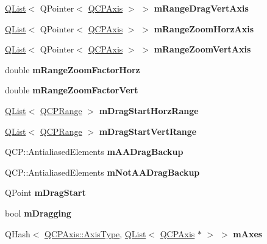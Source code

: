 \begin{DoxyCompactItemize}
\hyperlink{class_q_list}{Q\+List}$<$ Q\+Pointer$<$ \hyperlink{class_q_c_p_axis}{Q\+C\+P\+Axis} $>$ $>$ {\bfseries m\+Range\+Drag\+Vert\+Axis}
\item 
\mbox{\label{class_q_c_p_axis_rect_a3700988ec7ee02412de1fae4a75f7bf0}} 
\hyperlink{class_q_list}{Q\+List}$<$ Q\+Pointer$<$ \hyperlink{class_q_c_p_axis}{Q\+C\+P\+Axis} $>$ $>$ {\bfseries m\+Range\+Zoom\+Horz\+Axis}
\item 
\mbox{\label{class_q_c_p_axis_rect_ab6b597596c4cbfdf9b90aefd59863fdf}} 
\hyperlink{class_q_list}{Q\+List}$<$ Q\+Pointer$<$ \hyperlink{class_q_c_p_axis}{Q\+C\+P\+Axis} $>$ $>$ {\bfseries m\+Range\+Zoom\+Vert\+Axis}
\item 
\mbox{\label{class_q_c_p_axis_rect_ad08d0250ed7b99de387d0ea6c7fd4dc1}} 
double {\bfseries m\+Range\+Zoom\+Factor\+Horz}
\item 
\mbox{\label{class_q_c_p_axis_rect_a32f063629581d5bf82b12769940b34ad}} 
double {\bfseries m\+Range\+Zoom\+Factor\+Vert}
\item 
\mbox{\label{class_q_c_p_axis_rect_a6806a82287f962eeb35bbb7c02f56d1e}} 
\hyperlink{class_q_list}{Q\+List}$<$ \hyperlink{class_q_c_p_range}{Q\+C\+P\+Range} $>$ {\bfseries m\+Drag\+Start\+Horz\+Range}
\item 
\mbox{\label{class_q_c_p_axis_rect_a39719450bcd611c455763e650a81af52}} 
\hyperlink{class_q_list}{Q\+List}$<$ \hyperlink{class_q_c_p_range}{Q\+C\+P\+Range} $>$ {\bfseries m\+Drag\+Start\+Vert\+Range}
\item 
\mbox{\label{class_q_c_p_axis_rect_aa4a24f76360cfebe1bcf17a77fa7521b}} 
Q\+C\+P\+::\+Antialiased\+Elements {\bfseries m\+A\+A\+Drag\+Backup}
\item 
\mbox{\label{class_q_c_p_axis_rect_a6fcb12e052e276d57efbb128be31d6f5}} 
Q\+C\+P\+::\+Antialiased\+Elements {\bfseries m\+Not\+A\+A\+Drag\+Backup}
\item 
\mbox{\label{class_q_c_p_axis_rect_a032896b28f83a58010d8d533b78c49df}} 
Q\+Point {\bfseries m\+Drag\+Start}
\item 
\mbox{\label{class_q_c_p_axis_rect_ab49a6698194cf0e9e38a1d734c0888a8}} 
bool {\bfseries m\+Dragging}
\item 
\mbox{\label{class_q_c_p_axis_rect_ad51b376756280ee85c0ca367437fda7c}} 
Q\+Hash$<$ \hyperlink{class_q_c_p_axis_ae2bcc1728b382f10f064612b368bc18a}{Q\+C\+P\+Axis\+::\+Axis\+Type}, \hyperlink{class_q_list}{Q\+List}$<$ \hyperlink{class_q_c_p_axis}{Q\+C\+P\+Axis} $\ast$ $>$ $>$ {\bfseries m\+Axes}
\end{DoxyCompactItemize}
